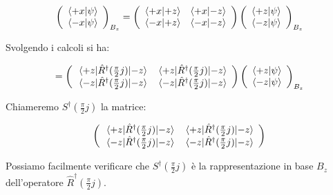 	\begin{equation}
		\left ( \begin{array}{c}
			\braket{+x}{\psi} \\
			\braket{-x}{\psi} \\
		\end{array} \right )_{B_z} = 
		\left ( \begin{array}{c c}
			\braket{+x}{+z} & \braket{+x}{-z} \\
			\braket{-x}{+z} & \braket{-x}{-z}
		\end{array} \right )
		\left ( \begin{array}{c}
			\braket{+z}{\psi} \\
			\braket{-z}{\psi} \\
		\end{array} \right )_{B_z}  
	\end{equation}

Svolgendo i calcoli si ha:

	\begin{equation}	
		=
		\left ( \begin{array}{c c}
			\mel{+z}{\hat{R}^\dagger ( \tfrac{\pi}{2} j )}{-z} & \mel{+z}{\hat{R}^\dagger ( \tfrac{\pi}{2}j )}{-z} \\ 
			\mel{-z}{\hat{R}^\dagger ( \tfrac{\pi}{2} j )}{-z} & \mel{-z}{\hat{R}^\dagger ( \tfrac{\pi}{2}j )}{-z} \\ 
		\end{array} \right )
		\left ( \begin{array}{c}
			\braket{+z}{\psi} \\
			\braket{-z}{\psi} \\
		\end{array} \right )_{B_z} 
	\end{equation}

Chiameremo $S^\dagger ( \tfrac{\pi}{2} j )$ la matrice:

	\[
		\left ( \begin{array}{c c}
			\mel{+z}{\hat{R}^\dagger ( \tfrac{\pi}{2} j)}{-z} & \mel{+z}{\hat{R}^\dagger ( \tfrac{\pi}{2} j)}{-z} \\ 
			\mel{-z}{\hat{R}^\dagger ( \tfrac{\pi}{2} j)}{-z} & \mel{-z}{\hat{R}^\dagger ( \tfrac{\pi}{2} j)}{-z} \\ 
		\end{array} \right )
	\]

Possiamo facilmente verificare che $S^\dagger ( \tfrac{\pi}{2} j )$ \`e la rappresentazione in base $B_z$ dell'operatore $\hat{R}^\dagger ( \tfrac{\pi}{2} j)$.

